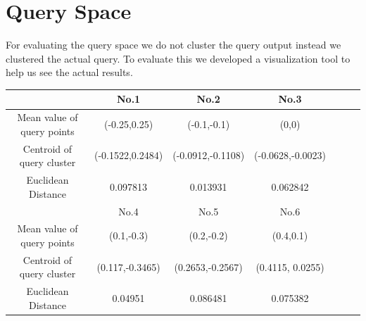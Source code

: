 \documentclass{lmproj}
\begin{document}
\section{Query Space}

For evaluating the query space we do not cluster the query output instead we clustered the actual query. To evaluate this we developed a visualization tool to help us see the actual results.

\begin{center}
 \label{table6}
\begin{tabular}{|c|c|c|c|c|c|c|}
	\hline   & No.1 & No.2 & No.3  \\ 
	\hline Mean value of query points & (-0.25,0.25) & (-0.1,-0.1) & (0,0)  \\ 
	\hline Centroid of query cluster & (-0.1522,0.2484) & (-0.0912,-0.1108) & (-0.0628,-0.0023) \\ 
	\hline Euclidean Distance & 0.097813 & 0.013931 & 0.062842 \\
	\hline   & No.4 & No.5 & No.6 \\ 
	\hline Mean value of query points &  (0.1,-0.3) & (0.2,-0.2) & (0.4,0.1) \\ 
	\hline Centroid of query cluster & (0.117,-0.3465) & (0.2653,-0.2567) & (0.4115, 0.0255) \\ 
	\hline Euclidean Distance & 0.04951 & 0.086481 & 0.075382 \\	
	\hline
\end{tabular}
\end{center}

\begin{figure} [h!]
\end{figure}
 
\end{document}
